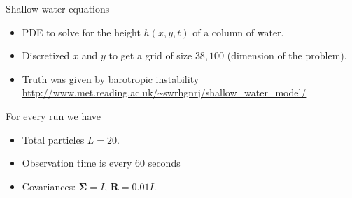 \documentclass[aspectratio=169]{beamer}
\newcommand{\modelcovariance}{\boldsymbol{\Sigma}}
\newcommand{\observationcovariance}{\boldsymbol{R}}
\begin{document}

%


\begin{frame}{Shallow water equations}
    \begin{itemize}
        \item PDE to solve for the height $h(x,y,t)$ of a column of water.
        \item Discretized $x$ and $y$ to get a grid of size $38,100$ (dimension of the problem).
        \item Truth was given by barotropic instability \url{http://www.met.reading.ac.uk/~swrhgnrj/shallow_water_model/}
    \end{itemize}

For every run we have
    \begin{itemize}
        \item Total particles $L=20$.
        \item Observation time is every 60 seconds
        \item Covariances: $\modelcovariance = I$, $\observationcovariance = 0.01I$.
    \end{itemize}
\end{frame}
\end{document}
